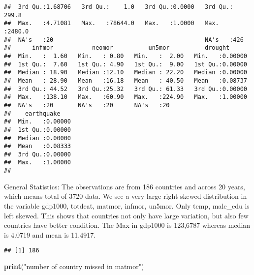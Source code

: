 \documentclass[
]{article}
\newenvironment{Shaded}{\begin{snugshade}}{\end{snugshade}}
\newcommand{\FunctionTok}[1]{\textcolor[rgb]{0.13,0.29,0.53}{\textbf{#1}}}
\newcommand{\NormalTok}[1]{#1}
\newcommand{\OtherTok}[1]{\textcolor[rgb]{0.56,0.35,0.01}{#1}}
\newcommand{\SpecialCharTok}[1]{\textcolor[rgb]{0.81,0.36,0.00}{\textbf{#1}}}
\newcommand{\StringTok}[1]{\textcolor[rgb]{0.31,0.60,0.02}{#1}}
\begin{document}
\begin{verbatim}
##  3rd Qu.:1.68706   3rd Qu.:    1.0   3rd Qu.:0.0000   3rd Qu.: 299.8  
##  Max.   :4.71081   Max.   :78644.0   Max.   :1.0000   Max.   :2480.0  
##  NA's   :20                                           NA's   :426     
##      infmor           neomor          un5mor          drought       
##  Min.   :  1.60   Min.   : 0.80   Min.   :  2.00   Min.   :0.00000  
##  1st Qu.:  7.60   1st Qu.: 4.90   1st Qu.:  9.00   1st Qu.:0.00000  
##  Median : 18.90   Median :12.10   Median : 22.20   Median :0.00000  
##  Mean   : 28.90   Mean   :16.18   Mean   : 40.50   Mean   :0.08737  
##  3rd Qu.: 44.52   3rd Qu.:25.32   3rd Qu.: 61.33   3rd Qu.:0.00000  
##  Max.   :138.10   Max.   :60.90   Max.   :224.90   Max.   :1.00000  
##  NA's   :20       NA's   :20      NA's   :20                        
##    earthquake     
##  Min.   :0.00000  
##  1st Qu.:0.00000  
##  Median :0.00000  
##  Mean   :0.08333  
##  3rd Qu.:0.00000  
##  Max.   :1.00000  
## 
\end{verbatim}

General Statistics: The observations are from 186 countries and across
20 years, which means total of 3720 data. We see a very large right
skewed distribution in the variable gdp1000, totdeat, matmor, infmor,
un5mor. Only temp, male\_edu is left skewed. This shows that countries
not only have large variation, but also few countries have better
condition. The Max in gdp1000 is 123,6787 whereas median is 4.0719 and
mean is 11.4917.

\begin{Shaded}
\end{Shaded}

\begin{verbatim}
## [1] 186
\end{verbatim}

\begin{Shaded}
\begin{Highlighting}[]
\FunctionTok{print}\NormalTok{(}\StringTok{"number of country missed in matmor"}\NormalTok{)}
\end{Highlighting}
\end{Shaded}
\end{document}
